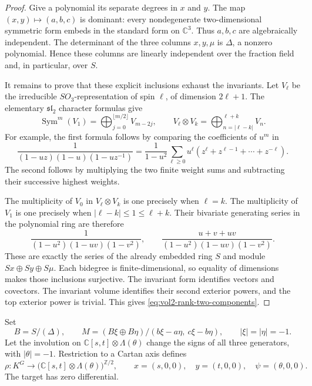 \begin{proof}
Give a polynomial its separate degrees in $x$ and $y$.
The map $(x,y)\mapsto(a,b,c)$ is dominant: every nondegenerate
two-dimensional symmetric form embeds in the standard form on
$\mathbb C^3$. Thus $a,b,c$ are algebraically independent.
The determinant of the three columns $x,y,\mu$ is $\Delta$, a nonzero
polynomial. Hence these columns are linearly independent over the
fraction field and, in particular, over $S$.

It remains to prove that these explicit inclusions exhaust the
invariants. Let $V_\ell$ be the irreducible $SO_3$-representation of
spin $\ell$, of dimension $2\ell+1$. The elementary
$\mathfrak{sl}_2$ character formulas give
\[
 \operatorname{Sym}^m(V_1)
   =\bigoplus_{j=0}^{\lfloor m/2\rfloor}V_{m-2j},
 \qquad
 V_\ell\otimes V_k
   =\bigoplus_{n=|\ell-k|}^{\ell+k}V_n.
\]
For example, the first formula follows by comparing the coefficients
of $u^m$ in
\[
 \frac1{(1-uz)(1-u)(1-uz^{-1})}
 =\frac1{1-u^2}\sum_{\ell\geq0}u^\ell
     (z^\ell+z^{\ell-1}+\cdots+z^{-\ell}).
\]
The second follows by multiplying the two finite weight sums and
subtracting their successive highest weights.

The multiplicity of $V_0$ in $V_\ell\otimes V_k$ is one precisely
when $\ell=k$. The multiplicity of $V_1$ is one precisely when
$|\ell-k|\leq1\leq\ell+k$. Their bivariate generating series in the
polynomial ring are therefore
\[
 \frac1{(1-u^2)(1-uv)(1-v^2)},\qquad
 \frac{u+v+uv}{(1-u^2)(1-uv)(1-v^2)}.
\]
These are exactly the series of the already embedded ring $S$ and
module $Sx\oplus Sy\oplus S\mu$. Each bidegree is finite-dimensional,
so equality of dimensions makes those inclusions surjective.
The invariant form identifies vectors and covectors.
The invariant volume identifies their second exterior powers, and
the top exterior power is trivial. This gives
\eqref{eq:vol2-rank-two-components}.
\end{proof}

Set
\[
 B=S/(\Delta),\qquad
 M=(B\xi\oplus B\eta)/(b\xi-a\eta,\ c\xi-b\eta),
 \qquad |\xi|=|\eta|=-1.
\]
Let the involution on
$\mathbb C[s,t]\otimes\Lambda(\theta)$ change the signs of all three
generators, with $|\theta|=-1$. Restriction to a Cartan axis defines
\begin{equation}\label{eq:vol2-classical-rank-two-restriction}
 \rho:K^G\longrightarrow
     \bigl(\mathbb C[s,t]\otimes\Lambda(\theta)\bigr)^{\mathbb Z/2},
 \qquad
 x=(s,0,0),\quad y=(t,0,0),\quad\psi=(\theta,0,0).
\end{equation}
The target has zero differential.


